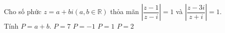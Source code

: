 \begin{ex}%
	Cho số phức $z=a+bi\left(a,b\in \mathbb{R}\right)$ thỏa mãn $\left| \dfrac{z-1}{z-i}\right|=1$ và $\left| \dfrac{z-3i}{z+i}\right|=1$. \\Tính $P=a+b$.
	\choice
	{$P=7$}
	{$P=-1$}
	{$P=1$}
	{\True $P=2$}
\end{ex}



